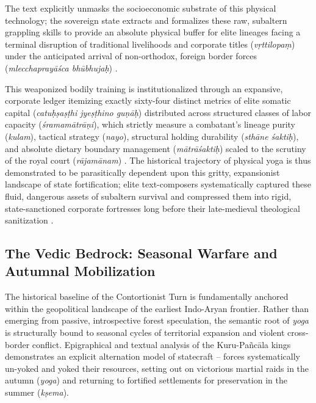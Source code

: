 \documentclass[11pt,twoside,letterpaper]{article}
\begin{document}
The text explicitly unmasks the socioeconomic substrate of this physical technology; the sovereign state extracts and formalizes these raw, subaltern grappling skills to provide an absolute physical buffer for elite lineages facing a terminal disruption of traditional livelihoods and corporate titles (\textit{v\d{r}ttilopa\d{m}}) under the anticipated arrival of non-orthodox, foreign border forces (\textit{mlecchapray\={a}\'sca bh\={u}bhuja\d{h}}) \citep{MP_7_v4}. 

This weaponized bodily training is institutionalized through an expansive, corporate ledger itemizing exactly sixty-four distinct metrics of elite somatic capital (\textit{catu\d{h}\d{s}a\d{s}\d{t}hi jye\d{s}\d{t}hino gu\d{n}\={a}\d{h}}) distributed across structured classes of labor capacity (\textit{\'sramam\={a}tr\={a}\d{n}i}), which strictly measure a combatant's lineage purity (\textit{kulam}), tactical strategy (\textit{nayo}), structural holding durability (\textit{sth\={a}ne \'sakti\d{h}}), and absolute dietary boundary management (\textit{m\={a}tr\={a}\'sakti\d{h}}) scaled to the scrutiny of the royal court (\textit{r\={a}jam\={a}nam}) \citep{MP_7_v5, Olivelle2011}. The historical trajectory of physical yoga is thus demonstrated to be parasitically dependent upon this gritty, expansionist landscape of state fortification; elite text-composers systematically captured these fluid, dangerous assets of subaltern survival and compressed them into rigid, state-sanctioned corporate fortresses long before their late-medieval theological sanitization \citep{MP_7_v6, Wujastyk2025}.


\subsection{The Vedic Bedrock: Seasonal Warfare and Autumnal Mobilization}
The historical baseline of the Contortionist Turn is fundamentally anchored within the geopolitical landscape of the earliest Indo-Aryan frontier. Rather than emerging from passive, introspective forest speculation, the semantic root of \textit{yoga} is structurally bound to seasonal cycles of territorial expansion and violent cross-border conflict. Epigraphical and textual analysis of the Kuru-Pa\~{n}c\={a}la kings demonstrates an explicit alternation model of statecraft -- forces systematically un-yoked and yoked their resources, setting out on victorious martial raids in the autumn (\textit{yoga}) and returning to fortified settlements for preservation in the summer (\textit{k\d{s}ema}).
\end{document}
